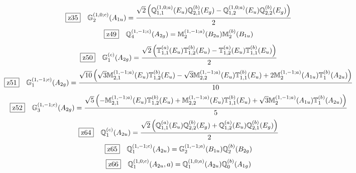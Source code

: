\documentclass[fleqn,10pt,landscape]{jsarticle}
\begin{document}
\begin{dmath*}
\hspace*{3mm}\fbox{z35}\quad \mathbb{G}_{2}^{(1,0;c)}(A_{1u})=\frac{\sqrt{2} \left(\mathbb{Q}_{1,1}^{(1,0;a)}(E_{u}) \mathbb{Q}_{2,1}^{(b)}(E_{g}) - \mathbb{Q}_{1,2}^{(1,0;a)}(E_{u}) \mathbb{Q}_{2,2}^{(b)}(E_{g})\right)}{2}
\end{dmath*}
\begin{dmath*}
\hspace*{3mm}\fbox{z49}\quad \mathbb{Q}_{4}^{(1,-1;c)}(A_{2g})=\mathbb{M}_{2}^{(1,-1;a)}(B_{2u}) \mathbb{M}_{2}^{(b)}(B_{1u})
\end{dmath*}
\begin{dmath*}
\hspace*{3mm}\fbox{z50}\quad \mathbb{G}_{1}^{(c)}(A_{2g})=\frac{\sqrt{2} \left(\mathbb{T}_{1,1}^{(a)}(E_{u}) \mathbb{T}_{1,2}^{(b)}(E_{u}) - \mathbb{T}_{1,2}^{(a)}(E_{u}) \mathbb{T}_{1,1}^{(b)}(E_{u})\right)}{2}
\end{dmath*}
\begin{dmath*}
\hspace*{3mm}\fbox{z51}\quad \mathbb{G}_{1}^{(1,-1;c)}(A_{2g})=\frac{\sqrt{10} \left(\sqrt{3} \mathbb{M}_{2,1}^{(1,-1;a)}(E_{u}) \mathbb{T}_{1,2}^{(b)}(E_{u}) - \sqrt{3} \mathbb{M}_{2,2}^{(1,-1;a)}(E_{u}) \mathbb{T}_{1,1}^{(b)}(E_{u}) + 2 \mathbb{M}_{2}^{(1,-1;a)}(A_{1u}) \mathbb{T}_{1}^{(b)}(A_{2u})\right)}{10}
\end{dmath*}
\begin{dmath*}
\hspace*{3mm}\fbox{z52}\quad \mathbb{G}_{3}^{(1,-1;c)}(A_{2g})=\frac{\sqrt{5} \left(- \mathbb{M}_{2,1}^{(1,-1;a)}(E_{u}) \mathbb{T}_{1,2}^{(b)}(E_{u}) + \mathbb{M}_{2,2}^{(1,-1;a)}(E_{u}) \mathbb{T}_{1,1}^{(b)}(E_{u}) + \sqrt{3} \mathbb{M}_{2}^{(1,-1;a)}(A_{1u}) \mathbb{T}_{1}^{(b)}(A_{2u})\right)}{5}
\end{dmath*}
\begin{dmath*}
\hspace*{3mm}\fbox{z64}\quad \mathbb{Q}_{1}^{(c)}(A_{2u})=\frac{\sqrt{2} \left(\mathbb{Q}_{1,1}^{(a)}(E_{u}) \mathbb{Q}_{2,2}^{(b)}(E_{g}) + \mathbb{Q}_{1,2}^{(a)}(E_{u}) \mathbb{Q}_{2,1}^{(b)}(E_{g})\right)}{2}
\end{dmath*}
\begin{dmath*}
\hspace*{3mm}\fbox{z65}\quad \mathbb{Q}_{1}^{(1,-1;c)}(A_{2u})=\mathbb{G}_{2}^{(1,-1;a)}(B_{1u}) \mathbb{Q}_{2}^{(b)}(B_{2g})
\end{dmath*}
\begin{dmath*}
\hspace*{3mm}\fbox{z66}\quad \mathbb{Q}_{1}^{(1,0;c)}(A_{2u},a)=\mathbb{Q}_{1}^{(1,0;a)}(A_{2u}) \mathbb{Q}_{0}^{(b)}(A_{1g})
\end{dmath*}
\end{document}
